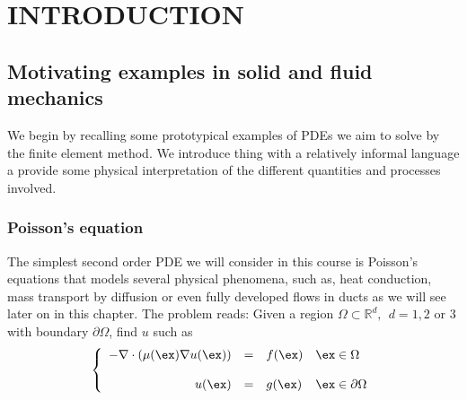 \setchapterpreamble[u]{\margintoc}
\chapter{INTRODUCTION}


\section{Motivating examples in solid and fluid mechanics}

We begin by recalling some prototypical examples of PDEs
we aim to solve by the finite element method.
We introduce thing with a relatively informal language
a provide some physical interpretation of the different
quantities and processes involved.

\subsection{Poisson's equation} 

The simplest second order PDE we will consider in this course is
Poisson's equations that models several physical phenomena, such as,
heat conduction, mass transport by diffusion or even
fully developed flows in ducts as we will see later on in this
chapter. The problem reads: Given a region $\Omega \subset \mathbb{R}^d,~~d=1,2$ or $3$
with boundary $\partial{\Omega}$, find $u$ such as
\begin{equation}
\left \{
\begin{array}{rcll}
-\nabla \cdot \left ( \mu(\ex) \nabla{u}(\ex) \right) & = & f(\ex) & \ex \in \Omega \\
& & & \\
u(\ex) & = & g(\ex) & \ex \in \partial{\Omega}
\end{array}
\right.
\end{equation}


